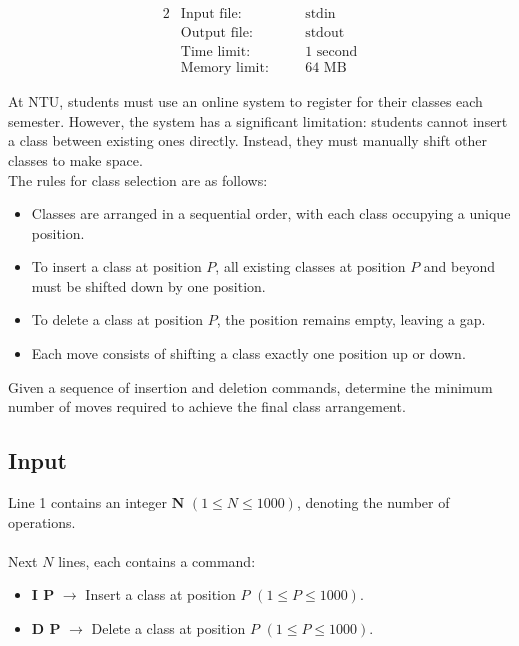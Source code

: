 \documentclass[12pt,a4paper]{article}
\begin{document}
\begin{alignat*} {2}
 &   \text{Input file:}   \quad     &&\text{stdin}\\
 &   \text{Output file:}  \quad     &&\text{stdout}\\
 &   \text{Time limit:}   \quad     &&\text{1 second}\\
 &   \text{Memory limit:} \quad     &&\text{64 MB}
\end{alignat*}

\noindent
At NTU, students must use an online system to register for their classes each semester. However, the system has a significant limitation: students cannot insert a class between existing ones directly. Instead, they must manually shift other classes to make space.
\\
\noindent
The rules for class selection are as follows:
\begin{itemize}
    \item Classes are arranged in a sequential order, with each class occupying a unique position.
    \item To insert a class at position \textbf{\( P \)}, all existing classes at position \textbf{\( P \)} and beyond must be shifted down by one position.
    \item To delete a class at position \textbf{\( P \)}, the position remains empty, leaving a gap.
    \item Each move consists of shifting a class exactly one position up or down.
\end{itemize}

\noindent
Given a sequence of insertion and deletion commands, determine the minimum number of moves required to achieve the final class arrangement.

\subsection*{\fontsize{16}{12}Input}
Line 1 contains an integer \(\textbf{N}\) \((1 \leq N \leq 1000)\), denoting the number of operations.
\\\\
\noindent
Next \textbf{\( N \)} lines, each contains a command:
    \begin{itemize}
        \item \textbf{I P} $\rightarrow$ Insert a class at position \( P \) \((1 \leq P \leq 1000)\).
        \item \textbf{D P} $\rightarrow$ Delete a class at position \( P \) \((1 \leq P \leq 1000)\).
    \end{itemize}
\end{document}
